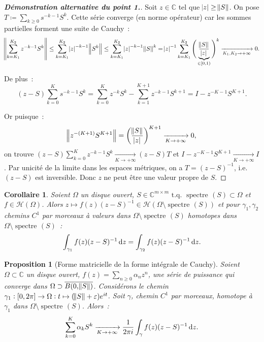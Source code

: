 \documentclass{report}
\DeclareMathOperator{\spectreOperator}{spectre\!}
\newcommand{\C}{{\mathbb C}}
\newcommand{\tq}{\text{ t.q. }}
\newcommand{\st}{\tq}
\newcommand{\pinfty}{{+\infty}}
\newcommand{\spectre}[1]{{\spectreOperator\left(#1\right)}}
\newtheorem{prp}[thm]{Proposition}
\newtheorem{cor}[thm]{Corollaire}
\theoremstyle{definition}
\theoremstyle{remark}
\begin{document}
\begin{proof}[\textnormal {\textbf {Démonstration alternative du point 1.}}]
Soit $z \in \C$ tel que $\abs z \geq \norm S$. On pose $T \coloneqq \sum_{k \geq 0}s^{-k-1}S^k$. Cette série converge (en norme opérateur) car les sommes
partielles forment une suite de Cauchy~:
\[
	\norm {\sum_{k=K_1}^{K_2}z^{-k-1}S^k} \leq \sum_{k=K_1}^{K_2}\abs z^{-k-1}\norm {S^k} \leq \sum_{k=K_1}^{K_2}\abs z^{-k-1}\norm S^k
	= \abs z^{-1}\sum_{k=K_1}^{K_2}\Bigg(\underbrace {\frac {\norm S}{\abs z}}_{\in [0, 1)}\Bigg)^k \xrightarrow[K_1,K_2 \to \pinfty]{} 0.
\]

De plus~:
\[(z-S)\sum_{k=0}^Ks^{-k-1}S^k = \sum_{k=0}^Kz^{-k}S^k - \sum_{k=1}^{K+1}z^{-k-1}S^{k+1} = I - z^{-K-1}S^{K+1}.\]

Or puisque~:
\[\norm {z^{-(K+1)}S^{K+1}} = \left(\frac {\norm S}{\abs z}\right)^{K+1} \xrightarrow[K \to \pinfty]{} 0,\]
on trouve $(z-S)\sum_{k=0}^Kz^{-k-1}S^k \xrightarrow[K \to \pinfty]{} (z-S)T$ et $I-z^{-K-1}S^{K+1} \xrightarrow[K \to \pinfty]{} I$. Par unicité de la limite
dans les espaces métriques, on a $T = (z-S)^{-1}$, i.e. $(z-S)$ est inversible. Donc $z$ ne peut être une valeur propre de $S$.
\end{proof}

\begin{cor}\label{cor:intégrales chemins homotopes} Soient $\Omega$ un disque ouvert, $S \in \C^{m \times m} \st \spectre S \subset \Omega$ et $f \in \mathscr H(\Omega)$.
Alors $z \mapsto f(z)(z-S)^{-1} \in \mathscr H(\Omega \setminus \spectre S)$ et pour $\gamma_1, \gamma_2$ chemins $C^1$ par morceaux à valeurs dans $\Omega \setminus \spectre S$
homotopes dans $\Omega \setminus \spectre S$~:
\[\int_{\gamma_1}f(z)(z-S)^{-1}\dif z = \int_{\gamma_2}f(z)(z-S)^{-1}\dif z.\]
\end{cor}

\begin{prp}[Forme matricielle de la forme intégrale de Cauchy] Soient $\Omega \subset \C$ un disque ouvert, $f(z) = \sum_{n \geq 0}\alpha_nz^n$, une série de puissance qui
converge dans $\Omega \supset \overline {B(0, \norm S)}$. Considérons le chemin $\gamma_1 : [0, 2\pi] \to \Omega : t \mapsto (\norm S + \varepsilon)e^{it}$.
Soit $\gamma$, chemin $C^1$ par morceaux, homotope à $\gamma_1$ dans $\Omega \setminus \spectre S$. Alors~:
\[\sum_{k =0}^K\alpha_kS^k \xrightarrow[K \to \pinfty]{} \frac 1{2\pi i}\int_\gamma f(z)(z-S)^{-1}\dif z.\]
\end{prp}
\end{document}
